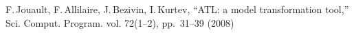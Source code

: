 \documentclass[conference]{IEEEtran}
\begin{document}
\begin{thebibliography}{99}
 F.\,Jouault, F.\,Allilaire, J.\,Bezivin, I.\,Kurtev, ``ATL: a model transformation tool,'' Sci. Comput. Program. vol. 72(1--2), pp.~31--39 (2008)

\end{thebibliography}
\end{document}
